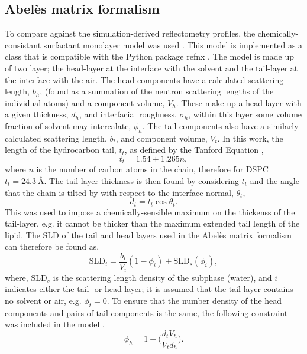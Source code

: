 \documentclass[amsmath,amssymb,twocolumn,superscriptaddress,aps,prl]{revtex4-1}
\begin{document}
\subsection{Abel\`{e}s matrix formalism}
To compare against the simulation-derived reflectometry profiles, the chemically-consistant surfactant monolayer model was used \cite{McCluskey2018,McCluskey2018a}.
This model is implemented as a class that is compatible with the Python package refnx \cite{Nelson2018,refnx}.
The model is made up of two layer; the head-layer at the interface with the solvent and the tail-layer at the interface with the air.
The head components have a calculated scattering length, $b_h$, (found as a summation of the neutron scattering lengths of the individual atoms) and a component volume, $V_h$.
These make up a head-layer with a given thickness, $d_h$, and interfacial roughness, $\sigma_h$, within this layer some volume fraction of solvent may intercalate, $\phi_h$.
The tail components also have a similarly calculated scattering length, $b_t$, and component volume, $V_t$.
In this work, the length of the hydrocarbon tail, $t_t$, as defined by the Tanford Equation \cite{Tanford1980},
%
\begin{equation}
  t_t = 1.54 + 1.265n,
\end{equation}
%
where $n$ is the number of carbon atoms in the chain, therefore for DSPC $t_t = \SI{24.3}{\angstrom}$.
The tail-layer thickness is then found by considering $t_t$ and the angle that the chain is tilted by with respect to the interface normal, $\theta_t$,
%
\begin{equation}
  d_t = t_t\cos{\theta_t}.
\end{equation}
%
This was used to impose a chemically-sensible maximum on the thickenss of the tail-layer, e.g. it cannot be thicker than the maximum extended tail length of the lipid.
The SLD of the tail and head layers used in the Abel\`{e}s matrix formalism can therefore be found as,
%
\begin{equation}
  \text{SLD}_i = \frac{b_i}{V_i}(1 - \phi_i) + \text{SLD}_s(\phi_i),
\end{equation}
%
where, $\text{SLD}_s$ is the scattering length density of the subphase (water), and $i$ indicates either the tail- or head-layer; it is assumed that the tail layer contains no solvent or air, e.g. $\phi_t = 0$.
To ensure that the number density of the head components and pairs of tail components is the same, the following constraint was included in the model \cite{Braun2017},
%
\begin{equation}
  \phi_h = 1 - \bigg(\frac{d_tV_h}{V_td_h}\bigg).
\end{equation}
\end{document}

